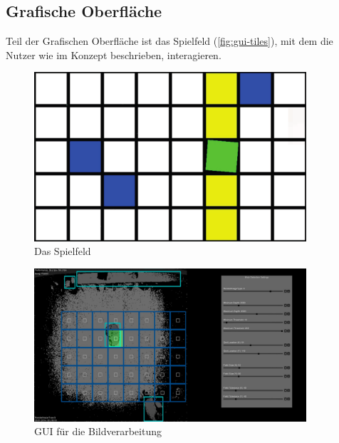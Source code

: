 \subsection{Grafische Oberfläche}

Teil der Grafischen Oberfläche ist das Spielfeld (\autoref{fig:gui-tiles}), mit dem die Nutzer wie im Konzept beschrieben, interagieren.

\begin{figure}[htbp] 
  \centering
     \includegraphics[width=0.9\textwidth]{images/gui-tiles}
  \caption{Das Spielfeld}
  \label{fig:gui-tiles}
\end{figure}

\begin{figure}[htbp] 
  \centering
     \includegraphics[width=0.9\textwidth]{images/Blob}
  \caption{GUI für die Bildverarbeitung}
  \label{fig:blob}
\end{figure}
